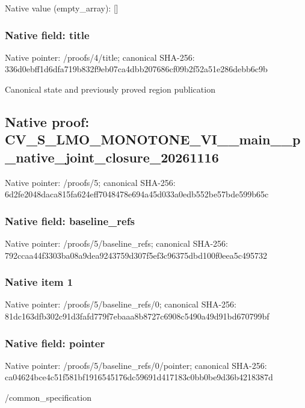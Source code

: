 \documentclass[10pt,a4paper]{article}
\begin{document}
Native value (empty\_\allowbreak{}array): []

\subsubsection{Native field: title}
Native pointer: /proofs/4/title; canonical SHA-256: 336d0ebff1d6dfa719b832f9eb07ca4dbb207686cf09b2f52a51e286debb6c9b

\begingroup\raggedright\sloppy Canonical state and previously proved region publication\par\endgroup

\subsection{Native proof: CV\_\allowbreak{}S\_\allowbreak{}LMO\_\allowbreak{}MONOTONE\_\allowbreak{}VI\_\allowbreak{}\_\allowbreak{}main\_\allowbreak{}\_\allowbreak{}p\_\allowbreak{}native\_\allowbreak{}joint\_\allowbreak{}closure\_\allowbreak{}20261116}
Native pointer: /proofs/5; canonical SHA-256: 6d2fe2048daca815fa624eff7048478e694a45d033a0edb552be57bde599b65c

\subsubsection{Native field: baseline\_\allowbreak{}refs}
Native pointer: /proofs/5/baseline\_\allowbreak{}refs; canonical SHA-256: 792ccaa44f3303ba08a9dea9243759d307f5ef3c96375dbd100f0eea5c495732

\subsubsection{Native item 1}
Native pointer: /proofs/5/baseline\_\allowbreak{}refs/0; canonical SHA-256: 81dc163dfb302c91d3fafd779f7ebaaa8b8727c6908c5490a49d91bd670799bf

\subsubsection{Native field: pointer}
Native pointer: /proofs/5/baseline\_\allowbreak{}refs/0/pointer; canonical SHA-256: ca04624bce4c51f581bf1916545176dc59691d417183c0bb0be9d36b4218387d

\begingroup\raggedright\sloppy /\allowbreak{}common\_\allowbreak{}specification\par\endgroup
\end{document}
